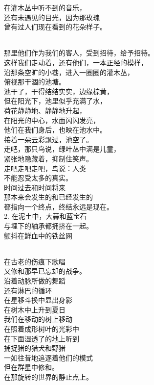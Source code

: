 \documentclass{article}
\begin{document}
在灌木丛中听不到的音乐，\\
还有未遇见的目光，因为那玫瑰\\
曾有过人们现在看到的花朵样子。 \par \newpage  \par 
\\
那里他们作为我们的客人，受到招待，给予招待。\\
这样我们走动着，还有他们，一本正经的模样，\\
沿那条空旷的小巷，进入一圈圈的灌木丛，\\
俯视那干涸的池塘。\\
池干了，干得结结实实，边缘棕黄，\\
但在阳光下，池里似乎充满了水，\\
荷花静静地、静静地升起，\\
在阳光的中心，水面闪闪发亮，\\
他们在我们身后，也映在池水中。\\
接着一朵云彩飘过，池空了。\\
走吧，那只鸟说，绿叶丛中满是儿童，\\
紧张地隐藏着，抑制住笑声。\\
走吧走吧走吧，鸟说：人类\\
不能忍受太多的真实。\\
时间过去和时间将来\\
那本来会发生的和已经发生的\\
都指向一个终点，终结永远是现在。\\
2. 在泥土中，大蒜和蓝宝石\\
与埋下的轴承都拥挤在一起。\\
颤抖在鲜血中的铁丝网 \par \newpage  \par 
\\
在古老的伤痕下歌唱\\
又修和那早已忘却的战争。\\
沿着动脉所做的舞蹈\\
还有淋巴的循环\\
在星移斗换中显出身影\\
在树木中上升到夏日\\
我们在移动的树上移动\\
在照着成形树叶的光彩中\\
在下面湿透了的地上听到\\
捕捉猪的猎犬和野猪\\
一如往昔地追逐着他们的模式\\
但在群星中修和。\\
在那旋转的世界的静止点上。\\
\end{document}

